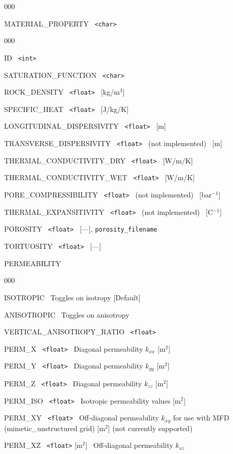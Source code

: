 \begin{deflist}{000}
\item[MATERIAL\_PROPERTY] \ {\tt <char>}
\begin{deflist}{000}
\item[ID] \ {\tt <int>}
\item[SATURATION\_FUNCTION] \ {\tt <char>}
\item[ROCK\_DENSITY] \ {\tt <float>} \ [kg/m$^3$]
\item[SPECIFIC\_HEAT] \ {\tt <float>} \ [J/kg/K]
\item[LONGITUDINAL\_DISPERSIVITY] \ {\tt <float>} \ [m]
\item[TRANSVERSE\_DISPERSIVITY] \ {\tt <float>} \ (not implemented) \ [m]
\item[THERMAL\_CONDUCTIVITY\_DRY] \ {\tt <float>} \ [W/m/K]
\item[THERMAL\_CONDUCTIVITY\_WET] \ {\tt <float>} \ [W/m/K]
\item[PORE\_COMPRESSIBILITY] \ {\tt <float>} \ (not implemented) \ [bar$^{-1}$]
\item[THERMAL\_EXPANSITIVITY] \ {\tt <float>} \ (not implemented) \ [C$^{-1}$]
\item[POROSITY] \ {\tt <float>} \ [---], {\tt porosity\_filename}
\item[TORTUOSITY] \ {\tt <float>} \ [---]
\item[PERMEABILITY] ~
\begin{deflist}{000}
\item[ISOTROPIC] \ Toggles on isotropy [Default]
\item[ANISOTROPIC] \ Toggles on anisotropy
\item[VERTICAL\_ANISOTROPY\_RATIO] \ {\tt <float>}
\item[PERM\_X] \ {\tt <float>} \ Diagonal permeability $k_{xx}$ [m$^2$]
\item[PERM\_Y] \ {\tt <float>} \ Diagonal permeability $k_{yy}$ [m$^2$]
\item[PERM\_Z] \ {\tt <float>} \ Diagonal permeability $k_{zz}$ [m$^2$]
\item[PERM\_ISO] \ {\tt <float>} \ Isotropic permeability values [m$^2$]
\item[PERM\_XY] \ {\tt <float>} \ Off-diagonal permeability $k_{xy}$ for use with MFD \\(mimetic\_unstructured grid) [m$^2$] (not currently supported)
\item[PERM\_XZ] \ {\tt <float>} [m$^2$] \ Off-diagonal permeability $k_{xz}$

\end{deflist}
\end{deflist}
\end{deflist}
